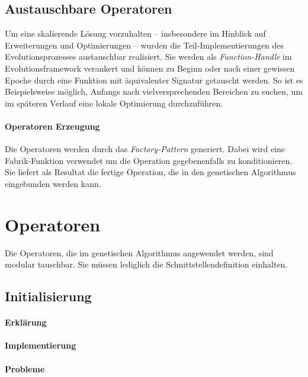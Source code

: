 \documentclass[12pt,a4paper]{scrartcl}
\begin{document}
\subsection{Austauschbare Operatoren}\label{sec:op}
Um eine skalierende Lösung vorzuhalten -- insbesondere im Hinblick auf Erweiterungen und Optimierungen -- wurden die Teil-Implementierungen des Evolutionsprozesses austauschbar realisiert. Sie werden als \emph{Function-Handle} im Evolutionsframework verankert und können zu Beginn oder nach einer gewissen Epoche durch eine Funktion mit äquivalenter Signatur getauscht werden. So ist es Beispielsweise möglich, Anfangs nach vielversprechenden Bereichen zu suchen, um im späteren Verlauf eine lokale Optimierung durchzuführen.

\paragraph{Operatoren Erzeugung} Die Operatoren werden durch das \emph{Factory-Pattern} generiert. Dabei wird eine Fabrik-Funktion verwendet um die Operation gegebenenfalls zu konditionieren. Sie liefert als Resultat die fertige Operation, die in den genetischen Algorithmus eingebunden werden kann.

\section{Operatoren}
Die Operatoren, die im genetischen Algorithmus angewendet werden, sind modular tauschbar. Sie müssen lediglich die Schnittstellendefinition einhalten.

\subsection{Initialisierung}
\paragraph{Erklärung}

\paragraph{Implementierung}
\paragraph{Probleme}
\end{document}
